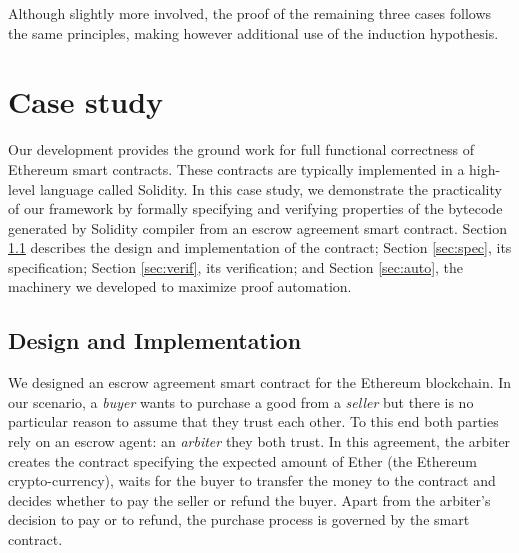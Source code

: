 \documentclass[sigplan,10pt]{acmart}\settopmatter{printfolios=true,printccs=false,printacmref=false}
\begin{document}
Although slightly more involved, the proof of the remaining three cases follows the
same principles,
making however additional use of the induction hypothesis.
%
\section{Case study}
\label{sec:case}



Our development provides the ground work for full functional correctness
of Ethereum smart contracts.
These contracts are typically implemented in a high-level
language called Solidity.
In this case study, we demonstrate the practicality of our framework
by formally specifying and verifying properties of the bytecode 
generated by Solidity compiler from an escrow agreement smart contract.
Section \ref{sec:design} describes the design and implementation of
the contract; Section \ref{sec:spec}, its specification;
Section \ref{sec:verif}, its verification;
and Section \ref{sec:auto}, the machinery we developed
to maximize proof automation.

\subsection{Design and Implementation}
\label{sec:design}
%
We designed an escrow agreement smart contract for the Ethereum blockchain.
In our scenario, a \textit{buyer} wants to purchase a good from a \textit{seller}
but there is no particular reason to assume that they trust each other.
To this end both parties rely on an
escrow agent: an \textit{arbiter} they both trust. 
In this agreement, the arbiter creates the contract specifying the
expected amount of Ether (the Ethereum crypto-currency), waits for the buyer to transfer the money to
the contract and decides whether to pay the seller or refund the buyer.
Apart from the arbiter's decision to pay or to refund, the purchase process
is governed by the smart contract.
\end{document}
